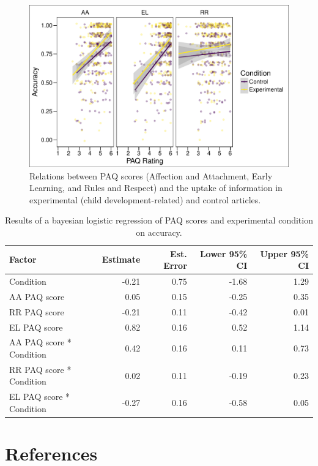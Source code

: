 \documentclass[man]{apa6}
\theoremstyle{definition}
\theoremstyle{definition}
\theoremstyle{definition}
\theoremstyle{remark}
\begin{document}
\begin{figure}
\centering
\includegraphics{PAQ_paper_files/figure-latex/uptake-1.pdf}
\caption{\label{fig:uptake}Relations between PAQ scores (Affection and
Attachment, Early Learning, and Rules and Respect) and the uptake of
information in experimental (child development-related) and control
articles.}
\end{figure}

\begin{table}[h]
\centering
\caption{Results of a bayesian logistic regression of PAQ scores and experimental condition on accuracy.} 
\label{tab:uptake}
\begin{tabular}{lrrrr}
  \hline
Factor & Estimate & Est. Error & Lower 95\% CI & Upper 95\% CI \\ 
  \hline
Condition & -0.21 & 0.75 & -1.68 & 1.29 \\ 
  AA PAQ score & 0.05 & 0.15 & -0.25 & 0.35 \\ 
  RR PAQ score & -0.21 & 0.11 & -0.42 & 0.01 \\ 
  EL PAQ score & 0.82 & 0.16 & 0.52 & 1.14 \\ 
  AA PAQ score * Condition & 0.42 & 0.16 & 0.11 & 0.73 \\ 
  RR PAQ score * Condition & 0.02 & 0.11 & -0.19 & 0.23 \\ 
  EL PAQ score * Condition & -0.27 & 0.16 & -0.58 & 0.05 \\ 
   \hline
\end{tabular}
\end{table}

\newpage

\section{References}\label{references}

\begingroup
\setlength{\parindent}{-0.5in} \setlength{\leftskip}{0.5in}

\hypertarget{refs}{}

\endgroup
\end{document}
